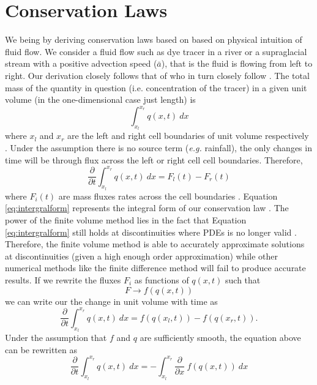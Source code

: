 \documentclass[review,onefignum,onetabnum]{siamart171218}
\begin{document}
\section{Conservation Laws}
We being by deriving conservation laws based on based on physical intuition of fluid flow. We consider a fluid flow such as dye tracer in a river or a supraglacial stream with a positive advection speed ($\bar a$), that is the fluid is flowing from left to right. Our derivation closely follows that of \cite{comp_seis} who in turn closely follow \cite{leveque_2002}. The total mass of the quantity in question (i.e. concentration of the tracer) in a given unit volume (in the one-dimensional case just length) is 
\begin{equation}
    \int_{x_l}^{x_r} q(x,t) \: dx
\end{equation}
where $x_l$ and $x_r$ are the left and right cell boundaries of unit volume respectively \cite{comp_seis}. Under the assumption there is no source term (\textit{e.g.} rainfall), the only changes in time will be through flux across the left or right cell cell boundaries. Therefore, 
\begin{equation}
    \frac{\partial}{\partial t} \int_{x_l}^{x_r} q(x,t) \: dx = F_l(t) - F_r(t)
     \label{eq:intergralform}
\end{equation}
where $F_i(t)$ are mass fluxes rates across the cell boundaries \cite{comp_seis}. Equation \ref{eq:intergralform} represents the integral form of our conservation law \cite{leveque_2002}. The power of the finite volume method lies in the fact that Equation \ref{eq:intergralform} still holds at discontinuities where PDEs is no longer valid \cite{comp_seis}. Therefore, the finite volume method is able to accurately approximate solutions at discontinuities (given a high enough order approximation) while other numerical methods like the finite difference method will fail to produce accurate results. If we rewrite the fluxes $F_i$ as functions of $q(x,t)$ such that
\begin{equation}
    F \xrightarrow{} f(q(x,t)) 
\end{equation}
we can write our the change in unit volume with time as 
\begin{equation}
    \frac{\partial}{\partial t} \int_{x_l}^{x_r} q(x,t) \: dx = f(q(x_l,t))  - f(q(x_r ,t)). 
    \label{eq:eqntoint}
\end{equation}
Under the assumption that $f$ and $q$ are sufficiently smooth, the equation above can be rewritten as
\begin{equation}
     \frac{\partial}{\partial t} \int_{x_l}^{x_r} q(x,t) \: dx= - \int_{x_l}^{x_r} \frac{\partial}{\partial x } \: f(q(x,t))\: dx
\end{equation}
\end{document}
